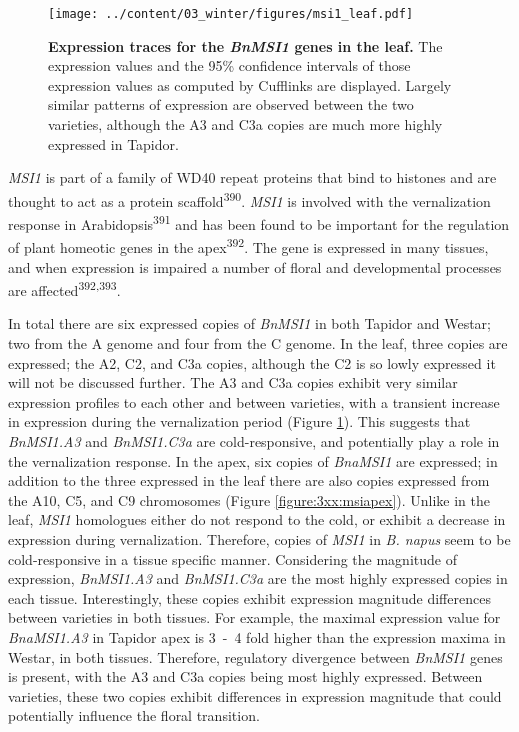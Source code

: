 \documentclass[12pt,]{book}
\begin{document}
\begin{figure}[htbp]
\centering
\texttt{[image: ../content/03\_winter/figures/msi1\_leaf.pdf]}
\caption{\textbf{Expression traces for the \emph{BnMSI1} genes in the
leaf.} The expression values and the 95\% confidence intervals of those
expression values as computed by Cufflinks are displayed. Largely
similar patterns of expression are observed between the two varieties,
although the A3 and C3a copies are much more highly expressed in
Tapidor.}\label{figure:3xx:fie1msi1leaf}
\end{figure}

\emph{MSI1} is part of a family of WD40 repeat proteins that bind to
histones and are thought to act as a protein
scaffold\textsuperscript{390}. \emph{MSI1} is involved with the
vernalization response in Arabidopsis\textsuperscript{391} and has been
found to be important for the regulation of plant homeotic genes in the
apex\textsuperscript{392}. The gene is expressed in many tissues, and
when expression is impaired a number of floral and developmental
processes are affected\textsuperscript{392,393}.

In total there are six expressed copies of \emph{BnMSI1} in both Tapidor
and Westar; two from the A genome and four from the C genome. In the
leaf, three copies are expressed; the A2, C2, and C3a copies, although
the C2 is so lowly expressed it will not be discussed further. The A3
and C3a copies exhibit very similar expression profiles to each other
and between varieties, with a transient increase in expression during
the vernalization period (Figure \ref{figure:3xx:fie1msi1leaf}). This
suggests that \emph{BnMSI1.A3} and \emph{BnMSI1.C3a} are
cold-responsive, and potentially play a role in the vernalization
response. In the apex, six copies of \emph{BnaMSI1} are expressed; in
addition to the three expressed in the leaf there are also copies
expressed from the A10, C5, and C9 chromosomes (Figure
\ref{figure:3xx:msiapex}). Unlike in the leaf, \emph{MSI1} homologues
either do not respond to the cold, or exhibit a decrease in expression
during vernalization. Therefore, copies of \emph{MSI1} in \emph{B.
napus} seem to be cold-responsive in a tissue specific manner.
Considering the magnitude of expression, \emph{BnMSI1.A3} and
\emph{BnMSI1.C3a} are the most highly expressed copies in each tissue.
Interestingly, these copies exhibit expression magnitude differences
between varieties in both tissues. For example, the maximal expression
value for \emph{BnaMSI1.A3} in Tapidor apex is 3~-~4 fold higher than
the expression maxima in Westar, in both tissues. Therefore, regulatory
divergence between \emph{BnMSI1} genes is present, with the A3 and C3a
copies being most highly expressed. Between varieties, these two copies
exhibit differences in expression magnitude that could potentially
influence the floral transition.
\end{document}
